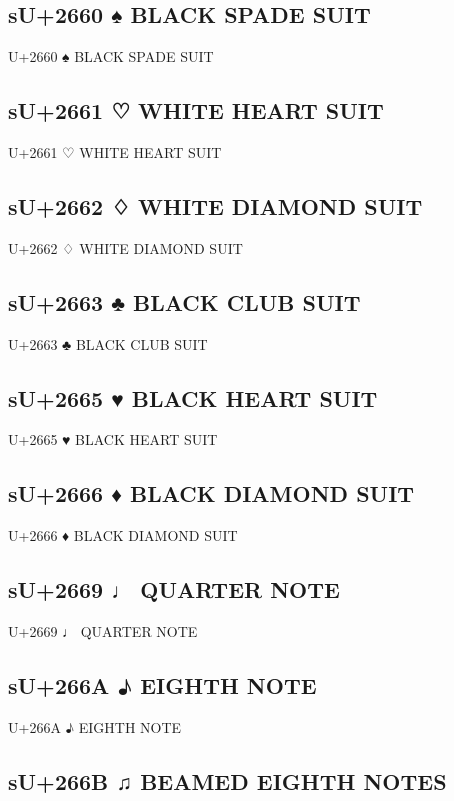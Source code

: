 \subsection{sU+2660 ♠ BLACK SPADE SUIT}

U+2660 ♠ BLACK SPADE SUIT

\subsection{sU+2661 ♡ WHITE HEART SUIT}

U+2661 ♡ WHITE HEART SUIT

\subsection{sU+2662 ♢ WHITE DIAMOND SUIT}

U+2662 ♢ WHITE DIAMOND SUIT

\subsection{sU+2663 ♣ BLACK CLUB SUIT}

U+2663 ♣ BLACK CLUB SUIT

\subsection{sU+2665 ♥ BLACK HEART SUIT}

U+2665 ♥ BLACK HEART SUIT

\subsection{sU+2666 ♦ BLACK DIAMOND SUIT}

U+2666 ♦ BLACK DIAMOND SUIT

\subsection{sU+2669 ♩ QUARTER NOTE}

U+2669 ♩ QUARTER NOTE

\subsection{sU+266A ♪  EIGHTH NOTE}

U+266A ♪  EIGHTH NOTE

\subsection{sU+266B ♫ BEAMED EIGHTH NOTES}

